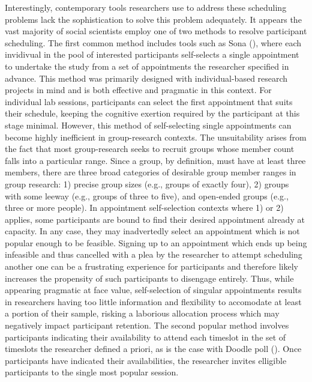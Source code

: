\documentclass{article}
\begin{document}
  \par 
  Interestingly, contemporary tools researchers use to address these scheduling problems 
  lack the sophistication to solve this problem adequately.
  It appears the vast majority
  of social scientists employ one of two methods to resolve participant scheduling.
  The first common method includes tools such as Sona (\cite{sauterBuildingHostingRecruiting2020}),
  where each invidivual in the pool of interested participants self-selects a single appointment
  to undertake the study from a set of appointments the researcher specified in advance. 
  This method was primarily designed with individual-based research projects in mind and is both effective and pragmatic in this context. 
  For individual lab sessions, participants can select the first appointment that suits their schedule, 
  keeping the cognitive exertion required by the participant at this stage minimal. 
  However, this method of self-selecting single appointments can become highly inefficient
  in group-research contexts. The unsuitability arises from the fact that most group-research seeks
  to recruit groups whose member count falls into a particular range.
  Since a group, by definition, must have at least three members, there are three broad categories of desirable group member ranges in group research: 
  1) precise group sizes (e.g., groups of exactly four), 2) groups with some leeway (e.g., groups of three to five), and open-ended groups (e.g., three or more people).
  In appointment self-selection contexts where 1) or 2) applies, some participants are bound to find their desired appointment already at capacity. In any case, 
  they may inadvertedly select an appointment which is not popular enough to be feasible.
  Signing up to an appointment which ends up being infeasible and thus cancelled with a plea by the researcher to attempt scheduling another one can be a
  frustrating experience for participants and therefore likely increases the propensity of such participants to disengage entirely.
  Thus, while appearing pragmatic at face value, self-selection of singular appointments results in researchers having too
  little information and flexibility to accomodate at least a portion of their sample, risking a laborious allocation process
  which may negatively impact participant retention. 
  The second popular method involves participants indicating their availability
  to attend each timeslot in the set of timeslots the researcher defined a priori, as is the case with Doodle poll (\cite{alrawiHowWellDoodle2016}).
  Once participants have indicated their availabilities, the researcher invites elligible participants to the single most popular session.  
\end{document}
